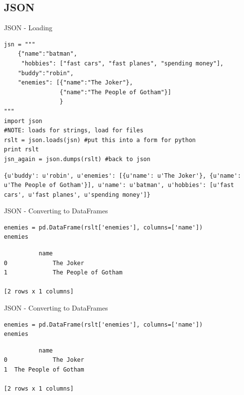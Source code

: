 \documentclass[presentation]{beamer}
\begin{document}
\subsection{JSON}
\label{sec-5-3}

\begin{frame}[fragile,label=sec-5-3-1]{JSON - Loading}
 \lstset{numbers=left,language=Python,label= ,caption= }
\begin{lstlisting}
jsn = """
    {"name":"batman",
     "hobbies": ["fast cars", "fast planes", "spending money"],
    "buddy":"robin",
    "enemies": [{"name":"The Joker"},
                {"name":"The People of Gotham"}]
                }
"""
import json
#NOTE: loads for strings, load for files
rslt = json.loads(jsn) #put this into a form for python
print rslt
jsn_again = json.dumps(rslt) #back to json
\end{lstlisting}

\lstset{numbers=left,language=Python,label= ,caption= }
\begin{lstlisting}
{u'buddy': u'robin', u'enemies': [{u'name': u'The Joker'}, {u'name': u'The People of Gotham'}], u'name': u'batman', u'hobbies': [u'fast cars', u'fast planes', u'spending money']}
\end{lstlisting}
\end{frame}


\begin{frame}[fragile,label=sec-5-3-2]{JSON - Converting to DataFrames}
 \lstset{numbers=left,language=Python,label= ,caption= }
\begin{lstlisting}
enemies = pd.DataFrame(rslt['enemies'], columns=['name'])
enemies
\end{lstlisting}

\lstset{numbers=left,language=Python,label= ,caption= }
\begin{lstlisting}
	      name
0             The Joker
1             The People of Gotham

[2 rows x 1 columns]
\end{lstlisting}
\end{frame}


\begin{frame}[fragile,label=sec-5-3-3]{JSON - Converting to DataFrames}
 \lstset{numbers=left,language=Python,label= ,caption= }
\begin{lstlisting}
enemies = pd.DataFrame(rslt['enemies'], columns=['name'])
enemies
\end{lstlisting}

\lstset{numbers=left,language=Python,label= ,caption= }
\begin{lstlisting}
	      name
0             The Joker
1  The People of Gotham

[2 rows x 1 columns]
\end{lstlisting}
\end{frame}
\end{document}
